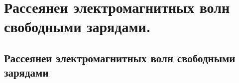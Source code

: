 \chapter{Рассеянеи электромагнитных волн свободными зарядами.}

\section{Рассеянеи электромагнитных волн свободными зарядами}
